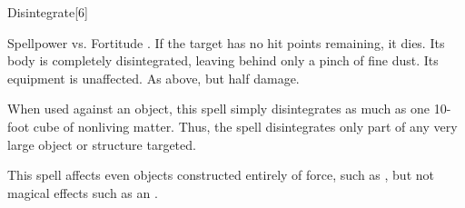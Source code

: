 \begin{spellsection}{Disintegrate}[6]
    \begin{spellheader}
    \end{spellheader}
    \begin{spellcontent}
        \begin{spelltargetinginfo}
        \end{spelltargetinginfo}
        \begin{spelleffects}
            \begin{spellattack}{Spellpower vs. Fortitude}
                \spellsuccess {}. If the target has no hit points remaining, it dies. Its body is completely disintegrated, leaving behind only a pinch of fine dust. Its equipment is unaffected.
                \spellfailure As above, but half damage.
            \end{spellattack}
            \spellspecial When used against an object, this spell simply disintegrates as much as one 10-foot cube of nonliving matter. Thus, the spell disintegrates only part of any very large object or structure targeted.
        \end{spelleffects}
    \end{spellcontent}
    \begin{spellfooter}
        \spellnotes This spell affects even objects constructed entirely of force, such as , but not magical effects such as an .
        \miscastrandom
    \end{spellfooter}
\end{spellsection}

